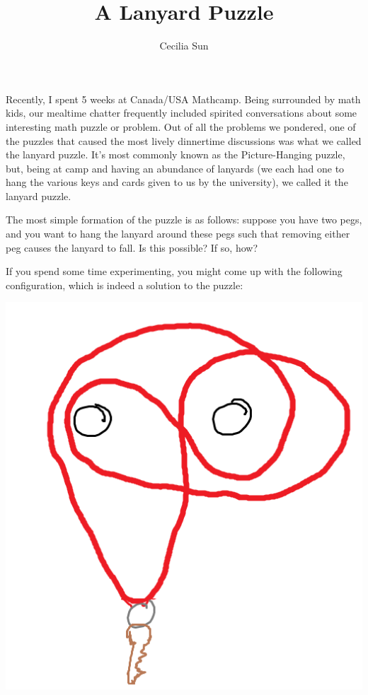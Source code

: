\documentclass{article}
\title{A Lanyard Puzzle}
\author{Cecilia Sun}
\begin{document}
\maketitle

Recently, I spent 5 weeks at Canada/USA Mathcamp. Being surrounded by math kids, our mealtime chatter frequently included spirited conversations about some interesting math puzzle or problem. Out of all the problems we pondered, one of the puzzles that caused the most lively dinnertime discussions was what we called the lanyard puzzle. It’s most commonly known as the Picture-Hanging puzzle, but, being at camp and having an abundance of lanyards (we each had one to hang the various keys and cards given to us by the university), we called it the lanyard puzzle. 

The most simple formation of the puzzle is as follows: suppose you have two pegs, and you want to hang the lanyard around these pegs such that removing either peg causes the lanyard to fall. Is this possible? If so, how? 

If you spend some time experimenting, you might come up with the following configuration, which is indeed a solution to the puzzle:

\begin{center}
    \includegraphics[scale=0.4]{images/lanyard2.png}
\end{center}
\end{document}
